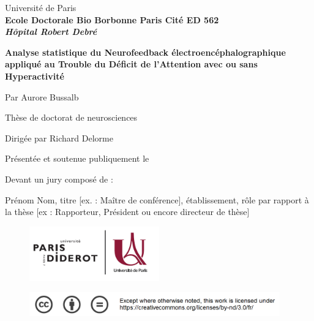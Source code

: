 
\begin{titlepage}

\vskip 1in

\begin{center}
{\LARGE Université de Paris} \\
\vskip 0in
\textbf{Ecole Doctorale Bio Borbonne Paris Cité ED 562} \\
\vskip 0in
\textbf{\textit{Hôpital Robert Debré}} \\
\vskip 0.3in

\Huge \textbf{Analyse statistique du Neurofeedback électroencéphalographique appliqué au Trouble du Déficit de l'Attention avec ou sans Hyperactivité}

\vskip 0.3in

%

{\Large Par Aurore Bussalb} \\

\vskip 0.3in

{\large Thèse de doctorat de neurosciences} \\

\vskip 0.2in

{\large Dirigée par Richard Delorme} \\

\vskip 0.1in

{\normalsize Présentée et soutenue publiquement le} \\
\vskip 0.1in

\end{center}

Devant un jury composé de : %

Prénom Nom,  titre [ex. : Maître de conférence],  établissement, rôle par rapport à la thèse [ex : Rapporteur, Président ou encore directeur de thèse]

\begin{figure}[t]
	\includegraphics[width=56.1mm]{logos/Logo_Universite_Paris.png} 
\end{figure}

\begin{figure}[b]
	\includegraphics[width=108.2mm]{logos/creative_commons_pas_de_modifs.png} 
\end{figure}

\end{titlepage}